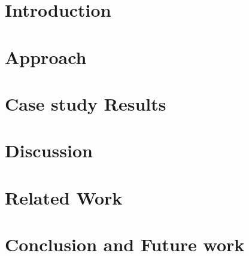 \documentclass{sig-alternate}
\begin{document}
\terms{}

\keywords{}

\section{Introduction}
\label{sec:introduction}


% 

\section{Approach}
\label{sec:approach}


\section{Case study Results}
\label{sec:case_study_results}


\section{Discussion}
\label{sec:discussion}


\section{Related Work}
\label{sec:related_work}


\section{Conclusion and Future work}
\label{sec:conclusion}



  
\end{document}
